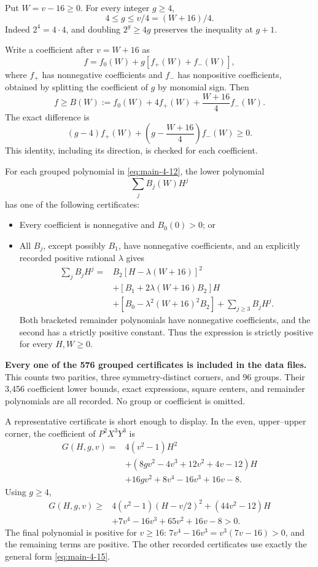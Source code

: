 \documentclass[11pt,reqno]{amsart}
\providecommand{\tightlist}{\setlength{\itemsep}{0.12em}\setlength{\parskip}{0pt}}
\theoremstyle{plain}
\begin{document}
Put \(W=v-16\ge0\). For every integer \(g\ge4\), \[
\boxed{4\le g\le v/4=(W+16)/4.}
\tag{4.13}\label{eq:main-4-13}
\] Indeed \(2^4=4\cdot4\), and doubling \(2^g\ge4g\) preserves the inequality at \(g+1\).

Write a coefficient after \(v=W+16\) as \[
f=f_0(W)+g[f_+(W)+f_-(W)],
\] where \(f_+\) has nonnegative coefficients and \(f_-\) has nonpositive coefficients, obtained by splitting the coefficient of \(g\) by monomial sign. Then \[
\boxed{f\ge B(W):=f_0(W)+4f_+(W)+\frac{W+16}{4}f_-(W).}
\tag{4.14}\label{eq:main-4-14}
\] The exact difference is \[
(g-4)f_+(W)+\left(g-\frac{W+16}{4}\right)f_-(W)\ge0.
\] This identity, including its direction, is checked for each coefficient.

For each grouped polynomial in \eqref{eq:main-4-12}, the lower polynomial \[
\sum_j B_j(W)H^j
\] has one of the following certificates:

\begin{itemize}
\tightlist
\item
  Every coefficient is nonnegative and \(B_0(0)>0\); or
\item
  All \(B_j\), except possibly \(B_1\), have nonnegative coefficients, and an explicitly recorded positive rational \(\lambda\) gives \[
  \begin{aligned}
  \sum_jB_jH^j={}&B_2[H-\lambda(W+16)]^2\\
  &+[B_1+2\lambda(W+16)B_2]H\\
  &+[B_0-\lambda^2(W+16)^2B_2]
   +\sum_{j\ge3}B_jH^j.
  \end{aligned}
  \tag{4.15}\label{eq:main-4-15}
  \] Both bracketed remainder polynomials have nonnegative coefficients, and the second has a strictly positive constant. Thus the expression is strictly positive for every \(H,W\ge0\).
\end{itemize}

\textbf{Every one of the 576 grouped certificates is included in the data files.} This counts two parities, three symmetry-distinct corners, and 96 groups. Their 3,456 coefficient lower bounds, exact expressions, square centers, and remainder polynomials are all recorded. No group or coefficient is omitted.

A representative certificate is short enough to display. In the even, upper--upper corner, the coefficient of \(P^2X^3Y^3\) is \[
\begin{aligned}
G(H,g,v)={}&4(v^2-1)H^2\\
&+(8gv^2-4v^3+12v^2+4v-12)H\\
&+16gv^2+8v^4-16v^3+16v-8.
\end{aligned}
\] Using \(g\ge4\), \[
\begin{aligned}
G(H,g,v)\ge{}&4(v^2-1)(H-v/2)^2
 +(44v^2-12)H\\
&+7v^4-16v^3+65v^2+16v-8>0.
\end{aligned}
\tag{4.16}\label{eq:main-4-16}
\] The final polynomial is positive for \(v\ge16\): \(7v^4-16v^3=v^3(7v-16)>0\), and the remaining terms are positive. The other recorded certificates use exactly the general form \eqref{eq:main-4-15}.
\end{document}
